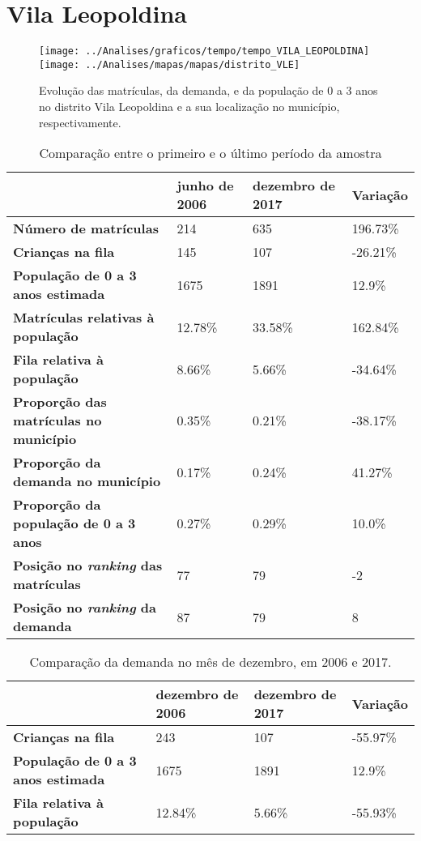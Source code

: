 \section{Vila Leopoldina}
\begin{figure}[H]
	\centering
	\texttt{[image: ../Analises/graficos/tempo/tempo\_VILA\_LEOPOLDINA]}
	\texttt{[image: ../Analises/mapas/mapas/distrito\_VLE]}
	\caption{Evolução das matrículas, da demanda, e da população de 0 a 3 anos no distrito Vila Leopoldina e a sua localização no município, respectivamente.}
\end{figure}
\begin{table}[H]
	\begin{tabular}{|l|l|l|l|}
		\hline
		\textbf{}                                      & \textbf{junho de 2006}       & \textbf{dezembro de 2017}    & \textbf{Variação} \\ \hline
		\textbf{Número de matrículas}                  & 214 & 635 & 196.73\% \\ \hline
		\textbf{Crianças na fila}                      & 145 & 107 & -26.21\% \\ \hline
		\textbf{População de 0 a 3 anos estimada}      & 1675 & 1891 & 12.9\% \\ \hline
		\textbf{Matrículas relativas à população}      & 12.78\% & 33.58\% & 162.84\% \\ \hline
		\textbf{Fila relativa à população}             & 8.66\% & 5.66\% & -34.64\% \\ \hline
		\textbf{Proporção das matrículas no município} & 0.35\% & 0.21\% & -38.17\% \\ \hline
		\textbf{Proporção da demanda no município}     & 0.17\% & 0.24\% & 41.27\% \\ \hline
		\textbf{Proporção da população de 0 a 3 anos}  & 0.27\% & 0.29\% & 10.0\% \\ \hline
		\textbf{Posição no \textit{ranking} das matrículas}     & 77 & 79 & -2 \\ \hline
		\textbf{Posição no \textit{ranking} da demanda}         & 87 & 79 & 8 \\ \hline
	\end{tabular}
	\caption{Comparação entre o primeiro e o último período da amostra}
\end{table}
\begin{table}[H]
	\begin{tabular}{|l|l|l|l|}
		\hline
		\textbf{}                                 & \textbf{dezembro de 2006} & \textbf{dezembro de 2017} & \textbf{Variação} \\ \hline
		\textbf{Crianças na fila}                      & 243 & 107 & -55.97\% \\ \hline
		\textbf{População de 0 a 3 anos estimada}      & 1675 & 1891 & 12.9\% \\ \hline
		\textbf{Fila relativa à população}             & 12.84\% & 5.66\% & -55.93\% \\ \hline
	\end{tabular}
	\caption{Comparação da demanda no mês de dezembro, em 2006 e 2017.}
\end{table}
